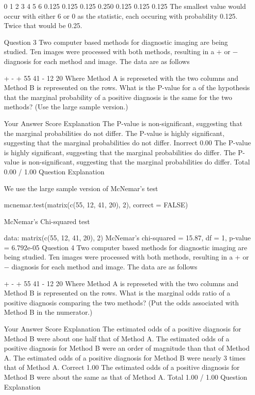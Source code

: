     0     1     2     3     4     5     6 
0.125 0.125 0.125 0.250 0.125 0.125 0.125 
The smallest value would occur with either 6 or 0 as the statistic, each occuring with probability 0.125. Twice that would be 0.25.

Question 3
Two computer based methods for diagnostic imaging are being studied. Ten images were processed with both methods, resulting in a + or − diagnosis for each method and image. The data are as follows

+	-
+	55	41
-	12	20
Where Method A is represeted with the two columns and Method B is represented on the rows. What is the P-value for a of the hypothesis that the marginal probability of a positive diagnosis is the same for the two methods? (Use the large sample version.)

Your Answer		Score	Explanation
The P-value is non-significant, suggesting that the marginal probabilities do not differ.			
The P-value is highly significant, suggesting that the marginal probabilities do not differ.	Inorrect	0.00	
The P-value is highly significant, suggesting that the marginal probabilities do differ.			
The P-value is non-significant, suggesting that the marginal probabilities do differ.			
Total		0.00 / 1.00	
Question Explanation

We use the large sample version of McNemar's test

mcnemar.test(matrix(c(55, 12, 41, 20), 2), correct = FALSE)

    McNemar's Chi-squared test

data:  matrix(c(55, 12, 41, 20), 2) 
McNemar's chi-squared = 15.87, df = 1, p-value = 6.792e-05
Question 4
Two computer based methods for diagnostic imaging are being studied. Ten images were processed with both methods, resulting in a + or − diagnosis for each method and image. The data are as follows

+	-
+	55	41
-	12	20
Where Method A is represeted with the two columns and Method B is represented on the rows. What is the marginal odds ratio of a positive diagnosis comparing the two methods? (Put the odds associated with Method B in the numerator.)

Your Answer		Score	Explanation
The estimated odds of a positive diagnosis for Method B were about one half that of Method A.			
The estimated odds of a positive diagnosis for Method B were an order of magnitude than that of Method A.			
The estimated odds of a positive diagnosis for Method B were nearly 3 times that of Method A.	Correct	1.00	
The estimated odds of a positive diagnosis for Method B were about the same as that of Method A.			
Total		1.00 / 1.00	
Question Explanation

